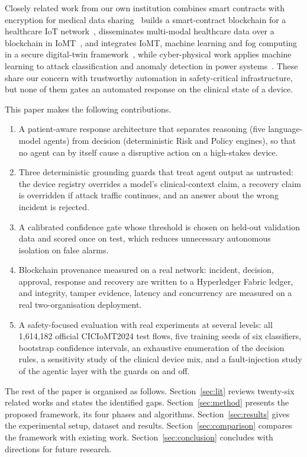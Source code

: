 \documentclass[preprint,12pt]{elsarticle}
\begin{document}
Closely related work from our own institution combines smart contracts with encryption for medical data sharing~\cite{vidhya2023} builds a smart-contract blockchain for a healthcare IoT network~\cite{mukhopadhyay2021}, disseminates multi-modal healthcare data over a blockchain in IoMT~\cite{arul2024}, and integrates IoMT, machine learning and fog computing in a secure digital-twin framework~\cite{savant2025}, while cyber-physical work applies machine learning to attack classification and anomaly detection in power systems~\cite{pranav2026,vignes2025}. These share our concern with trustworthy automation in safety-critical infrastructure, but none of them gates an automated response on the clinical state of a device.

This paper makes the following contributions.
\begin{enumerate}
  \item A patient-aware response architecture that separates reasoning (five language-model agents) from decision (deterministic Risk and Policy engines), so that no agent can by itself cause a disruptive action on a high-stakes device.
  \item Three deterministic grounding guards that treat agent output as untrusted: the device registry overrides a model's clinical-context claim, a recovery claim is overridden if attack traffic continues, and an answer about the wrong incident is rejected.
  \item A calibrated confidence gate whose threshold is chosen on held-out validation data and scored once on test, which reduces unnecessary autonomous isolation on false alarms.
  \item Blockchain provenance measured on a real network: incident, decision, approval, response and recovery are written to a Hyperledger Fabric ledger, and integrity, tamper evidence, latency and concurrency are measured on a real two-organisation deployment.
  \item A safety-focused evaluation with real experiments at several levels: all 1,614,182 official CICIoMT2024 test flows, five training seeds of six classifiers, bootstrap confidence intervals, an exhaustive enumeration of the decision rules, a sensitivity study of the clinical device mix, and a fault-injection study of the agentic layer with the guards on and off.
\end{enumerate}

The rest of the paper is organised as follows. Section~\ref{sec:lit} reviews twenty-six related works and states the identified gaps. Section~\ref{sec:method} presents the proposed framework, its four phases and algorithms. Section~\ref{sec:results} gives the experimental setup, dataset and results. Section~\ref{sec:comparison} compares the framework with existing work. Section~\ref{sec:conclusion} concludes with directions for future research.
\end{document}
